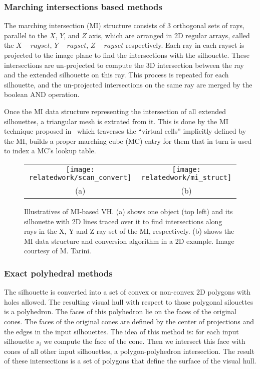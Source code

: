 \subsubsection{Marching intersections based methods}
The marching intersection (MI) structure consists of 3 orthogonal sets of rays, parallel to the $X$, $Y$, and $Z$ axis, which are arranged in 2D regular arrays, called the $X-rayset$, $Y-rayset$, $Z-rayset$ respectively. Each ray in each rayset is projected to the image plane to find the intersections with the silhouette. These intersections are un-projected to compute the 3D intersection between the ray and the extended silhouette on this ray. This process is repeated for each silhouette, and the un-projected intersections on the same ray are merged by the boolean AND operation.

Once the MI data structure representing the intersection of all extended silhouettes, a triangular mesh is extrated from it. This is done by the MI technique proposed in~\cite{rocchini2001marching} which traverses the ``virtual cells'' implicitly defined by the MI, builds a proper marching cube (MC) entry for them that in turn is used to index a MC's lookup table.
\begin{figure}[h]
\centering
\begin{tabular}{cc}
\texttt{[image: relatedwork/scan\_convert]}&
\texttt{[image: relatedwork/mi\_struct]}\\
(a) & (b)\\
\end{tabular}
\caption{Illustratives of MI-based VH. (a) shows one object (top left) and its silhouette with 2D lines traced over it to find intersections along rays in the X, Y and Z ray-set of the MI, respectively. (b) shows the MI data structure and conversion algorithm in a 2D example. Image courtesy of M. Tarini.}
\label{fig:robust_pc}
\end{figure}

\subsubsection{Exact polyhedral methods}
The silhouette is converted into a set of convex or non-convex 2D polygons with holes allowed. The resulting visual hull with respect to those polygonal silouettes is a polyhedron. The faces of this polyhedron lie on the faces of the original cones. The faces of the original cones are defined by the center of projections and the edges in the input silhouettes. The idea of this method is: for each input silhouette $s_i$ we compute the face of the cone. Then we intersect this face with cones of all other input silhouettes, \ie a polygon-polyhedron intersection. The result of these intersections is a set of polygons that define the surface of the visual hull.

